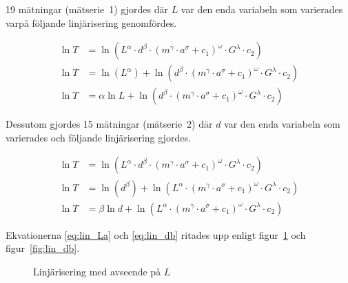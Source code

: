 \documentclass[a4paper,12pt]{article}
\begin{document}
19 mätningar (mätserie~1) gjordes där $L$ var den enda variabeln som varierades
varpå följande linjärisering genomfördes.

\begin{align}
  \ln T &= \ln (L^\alpha \cdot d^\beta \cdot (m^\gamma \cdot a^\sigma + c_1)^\omega \cdot G^\lambda \cdot c_2) \nonumber \\
  \ln T &= \ln (L^\alpha) + \ln (d^\beta \cdot (m^\gamma \cdot a^\sigma + c_1)^\omega \cdot G^\lambda \cdot c_2) \nonumber \\
  \ln T &= \alpha \ln L + \ln (d^\beta \cdot (m^\gamma \cdot a^\sigma + c_1)^\omega \cdot G^\lambda \cdot c_2)  \label{eq:lin_La}
\end{align}

Dessutom gjordes 15 mätningar (mätserie~2) där $d$ var den enda variabeln som
varierades och följande linjärisering gjordes.

\begin{align}
  \ln T &= \ln (L^\alpha \cdot d^\beta \cdot (m^\gamma \cdot a^\sigma + c_1)^\omega \cdot G^\lambda \cdot c_2) \nonumber \\
  \ln T &= \ln (d^\beta) + \ln (L^\alpha \cdot (m^\gamma \cdot a^\sigma + c_1)^\omega \cdot G^\lambda \cdot c_2) \nonumber \\
  \ln T &= \beta\ln d + \ln (L^\alpha \cdot (m^\gamma \cdot a^\sigma + c_1)^\omega \cdot G^\lambda \cdot c_2)  \label{eq:lin_db}
\end{align}

Ekvationerna \eqref{eq:lin_La} och \eqref{eq:lin_db} ritades upp enligt
figur~\ref{fig:lin_La} och figur~\ref{fig:lin_db}.

\begin{figure}
  \caption{Linjärisering med avseende på $L$}
  \label{fig:lin_La}
\end{figure}
\end{document}
